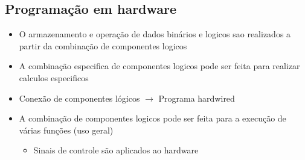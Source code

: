 \documentclass[12pt]{article}
\begin{document}
    \subsection{Programação em hardware}
    \begin{itemize}
        \item O armazenamento e operação de dados binários e logicos sao 
        realizados a partir da combinação de componentes logicos
        \item A combinação especifica de componentes logicos pode ser feita 
        para realizar calculos especificos
        \item Conexão de componentes lógicos $\rightarrow$ Programa hardwired
        \item A combinação de componentes logicos pode ser feita para a 
        execução de várias funções (uso geral)
        \begin{itemize}
            \item Sinais de controle são aplicados ao hardware
        \end{itemize}
    \end{itemize}
\end{document}
